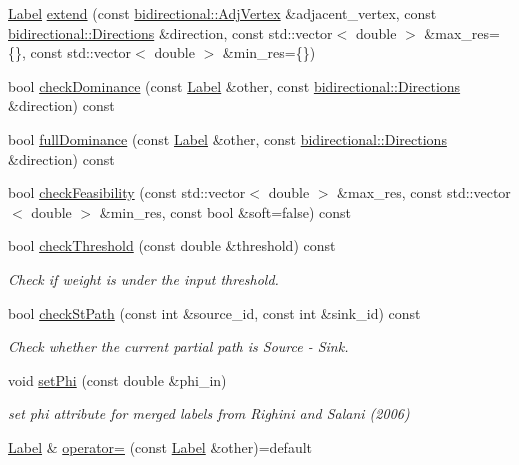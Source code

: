 \begin{DoxyCompactItemize}
\hyperlink{classlabelling_1_1Label}{Label} \hyperlink{classlabelling_1_1Label_a23f7e5da2fb22dca07977aad9bfa9ad3}{extend} (const \hyperlink{structbidirectional_1_1AdjVertex}{bidirectional\+::\+Adj\+Vertex} \&adjacent\+\_\+vertex, const \hyperlink{namespacebidirectional_a4cbe6f0bfbd3629c2cd44c98014aed70}{bidirectional\+::\+Directions} \&direction, const std\+::vector$<$ double $>$ \&max\+\_\+res=\{\}, const std\+::vector$<$ double $>$ \&min\+\_\+res=\{\})
\item 
bool \hyperlink{classlabelling_1_1Label_ad5afbf2f5d2c6f208283021186783883}{check\+Dominance} (const \hyperlink{classlabelling_1_1Label}{Label} \&other, const \hyperlink{namespacebidirectional_a4cbe6f0bfbd3629c2cd44c98014aed70}{bidirectional\+::\+Directions} \&direction) const
\item 
bool \hyperlink{classlabelling_1_1Label_a3f59b4a2818a4b0096080cd5f830b73d}{full\+Dominance} (const \hyperlink{classlabelling_1_1Label}{Label} \&other, const \hyperlink{namespacebidirectional_a4cbe6f0bfbd3629c2cd44c98014aed70}{bidirectional\+::\+Directions} \&direction) const
\item 
bool \hyperlink{classlabelling_1_1Label_adc3068c1147414d77f0f7696b4687e69}{check\+Feasibility} (const std\+::vector$<$ double $>$ \&max\+\_\+res, const std\+::vector$<$ double $>$ \&min\+\_\+res, const bool \&soft=false) const
\item 
bool \hyperlink{classlabelling_1_1Label_a72d0d91c2d99edbcdc36aa157586cf00}{check\+Threshold} (const double \&threshold) const
\begin{DoxyCompactList}\small\item\em Check if weight is under the input threshold. \end{DoxyCompactList}\item 
bool \hyperlink{classlabelling_1_1Label_a0e4957ff69cf08cfdc743df10d50d3c7}{check\+St\+Path} (const int \&source\+\_\+id, const int \&sink\+\_\+id) const
\begin{DoxyCompactList}\small\item\em Check whether the current partial path is Source -\/ Sink. \end{DoxyCompactList}\item 
void \hyperlink{classlabelling_1_1Label_afffea46e29dc7074edd10470c5dfeb87}{set\+Phi} (const double \&phi\+\_\+in)
\begin{DoxyCompactList}\small\item\em set phi attribute for merged labels from Righini and Salani (2006) \end{DoxyCompactList}\item 
\hyperlink{classlabelling_1_1Label}{Label} \& \hyperlink{classlabelling_1_1Label_a96fec70e1378988bb3d01f3aee8ab676}{operator=} (const \hyperlink{classlabelling_1_1Label}{Label} \&other)=default
\end{DoxyCompactItemize}
